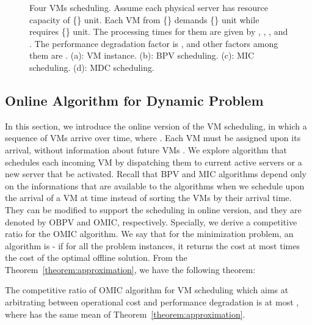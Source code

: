 \documentclass[10pt,journal]{IEEEtran}
\begin{document}
\begin{figure}
\caption{\label{fig:behaviour_algo}Four VMs scheduling. Assume each physical server has resource capacity of \{\} unit. Each VM from \{\} demands \{\} unit while  requires \{\} unit. The processing times for them are given by , , , and . The performance degradation factor  is , and other factors among them are . (a): VM instance. (b): BPV scheduling. (c): MIC scheduling. (d): MDC scheduling.}
\end{figure}

\subsection{Online Algorithm for Dynamic Problem}
In this section, we introduce the online version of the VM scheduling, in which a sequence  of VMs arrive over time, where . Each VM  must be assigned upon its arrival, without information about future VMs . We explore algorithm that schedules each incoming VM by dispatching them to current active servers or a new server that be activated. Recall that BPV and MIC algorithms depend only on the informations that are available to the algorithms when we schedule upon the arrival of a VM  at time  instead of sorting the VMs by their arrival time. They can be modified to support the scheduling in online version, and they are denoted by OBPV and OMIC, respectively. Specially, we derive a competitive ratio for the OMIC algorithm. We say that for the minimization problem, an algorithm is - if for all the problem instances, it returns the cost at most  times the cost of the optimal offline solution. From the Theorem~\ref{theorem:approximation}, we have the following theorem:
\begin{theorem}
The competitive ratio of OMIC algorithm for VM scheduling which aims at arbitrating between operational cost and performance degradation is at most , where  has the same mean of Theorem~\ref{theorem:approximation}. \label{theorem:competitive}
\end{theorem}
\end{document}
